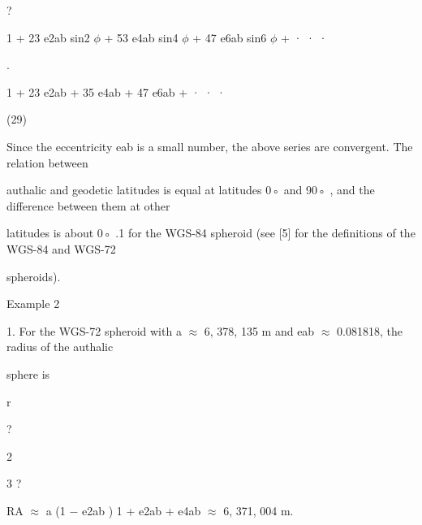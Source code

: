 \documentclass[a4paper,portrait,12pt]{article}
\begin{document}
?


\begin{flushleft}
1 + 23 e2ab sin2 $\phi$ + 53 e4ab sin4 $\phi$ + 47 e6ab sin6 $\phi$ + · · ·
\end{flushleft}


.


\begin{flushleft}
1 + 23 e2ab + 35 e4ab + 47 e6ab + · · ·
\end{flushleft}





(29)





\begin{flushleft}
Since the eccentricity eab is a small number, the above series are convergent. The relation between
\end{flushleft}


\begin{flushleft}
authalic and geodetic latitudes is equal at latitudes 0◦ and 90◦ , and the difference between them at other
\end{flushleft}


\begin{flushleft}
latitudes is about 0◦ .1 for the WGS-84 spheroid (see [5] for the definitions of the WGS-84 and WGS-72
\end{flushleft}


\begin{flushleft}
spheroids).
\end{flushleft}


\begin{flushleft}
Example 2
\end{flushleft}


\begin{flushleft}
1. For the WGS-72 spheroid with a $\approx$ 6, 378, 135 m and eab $\approx$ 0.081818, the radius of the authalic
\end{flushleft}


\begin{flushleft}
sphere is
\end{flushleft}


\begin{flushleft}
r
\end{flushleft}


?


2


3 ?


\begin{flushleft}
RA $\approx$ a (1 $-$ e2ab ) 1 + e2ab + e4ab $\approx$ 6, 371, 004 m.
\end{flushleft}
\end{document}
